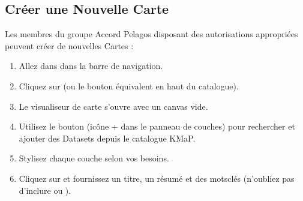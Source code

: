\documentclass[letterpaper,10pt,english]{sphinxmanual}
\begin{document}
\subsection{Créer une Nouvelle Carte}
\label{\detokenize{fr/04_explorer_cartes:creer-une-nouvelle-carte}}
\sphinxAtStartPar
Les membres du groupe Accord Pelagos disposant des autorisations appropriées peuvent
créer de nouvelles Cartes :
\begin{enumerate}
%
\item {} 
\sphinxAtStartPar
Allez dans  dans la barre de navigation.

\item {} 
\sphinxAtStartPar
Cliquez sur  (ou le bouton équivalent en haut du catalogue).

\item {} 
\sphinxAtStartPar
Le visualiseur de carte s’ouvre avec un canvas vide.

\item {} 
\sphinxAtStartPar
Utilisez le bouton  (icône + dans le panneau de couches) pour
rechercher et ajouter des Datasets depuis le catalogue KMaP.

\item {} 
\sphinxAtStartPar
Stylisez chaque couche selon vos besoins.

\item {} 
\sphinxAtStartPar
Cliquez sur  et fournissez un titre, un résumé et des mots\sphinxhyphen{}clés
(n’oubliez pas d’inclure  ou ).

\end{enumerate}



\renewcommand{\indexname}{Index}
\printindex
\end{document}
